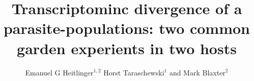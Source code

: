 \documentclass[10pt]{bmc_article}
\newenvironment{bmcformat}{\begin{raggedright}\baselineskip20pt\sloppy\setboolean{publ}{false}}{\end{raggedright}\baselineskip20pt\sloppy}
\begin{document}
\begin{bmcformat}



  \title{Transcriptominc divergence of a parasite-populations: two
    common garden experients in two hosts}
 


\author{Emanuel G Heitlinger\correspondingauthor$^{1,2}$%
       Horst Taraschewski$^1$%
       and Mark Blaxter$^2$%
     }%
      


      \address{%
        \iid(1)Department of Ecology and Parasitology, Zoological
        Institute 1, University of Karlsruhe,%
        Kornblumenstrasse 13, Karlsruhe, Germany\\
        \iid(2)Institute of Evolutionary Biology, The Ashworth laboratories, The University of Edinburgh, King's Buildings Campus, Edinburgh, UK
      }%

\maketitle




\end{bmcformat}
\end{document}
